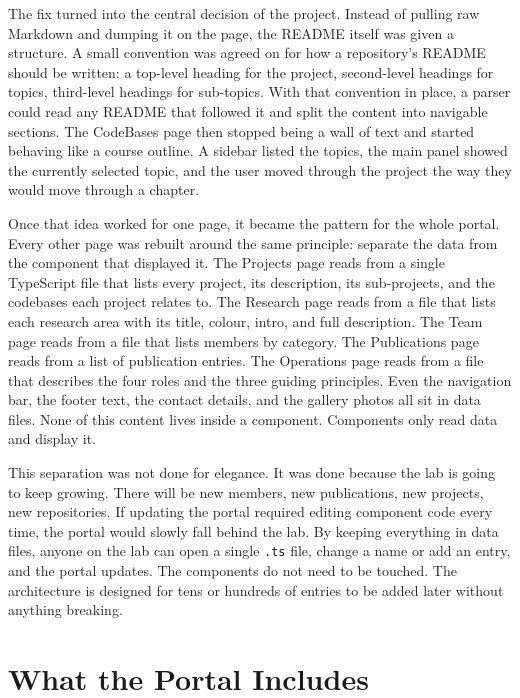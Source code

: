 The fix turned into the central decision of the project. Instead of pulling raw Markdown and dumping it on the page, the README itself was given a structure. A small convention was agreed on for how a repository's README should be written: a top-level heading for the project, second-level headings for topics, third-level headings for sub-topics. With that convention in place, a parser could read any README that followed it and split the content into navigable sections. The CodeBases page then stopped being a wall of text and started behaving like a course outline. A sidebar listed the topics, the main panel showed the currently selected topic, and the user moved through the project the way they would move through a chapter.

Once that idea worked for one page, it became the pattern for the whole portal. Every other page was rebuilt around the same principle: separate the data from the component that displayed it. The Projects page reads from a single TypeScript file that lists every project, its description, its sub-projects, and the codebases each project relates to. The Research page reads from a file that lists each research area with its title, colour, intro, and full description. The Team page reads from a file that lists members by category. The Publications page reads from a list of publication entries. The Operations page reads from a file that describes the four roles and the three guiding principles. Even the navigation bar, the footer text, the contact details, and the gallery photos all sit in data files. None of this content lives inside a component. Components only read data and display it.

This separation was not done for elegance. It was done because the lab is going to keep growing. There will be new members, new publications, new projects, new repositories. If updating the portal required editing component code every time, the portal would slowly fall behind the lab. By keeping everything in data files, anyone on the lab can open a single \texttt{.ts} file, change a name or add an entry, and the portal updates. The components do not need to be touched. The architecture is designed for tens or hundreds of entries to be added later without anything breaking.

\section{What the Portal Includes}\label{sec:intro-includes}


